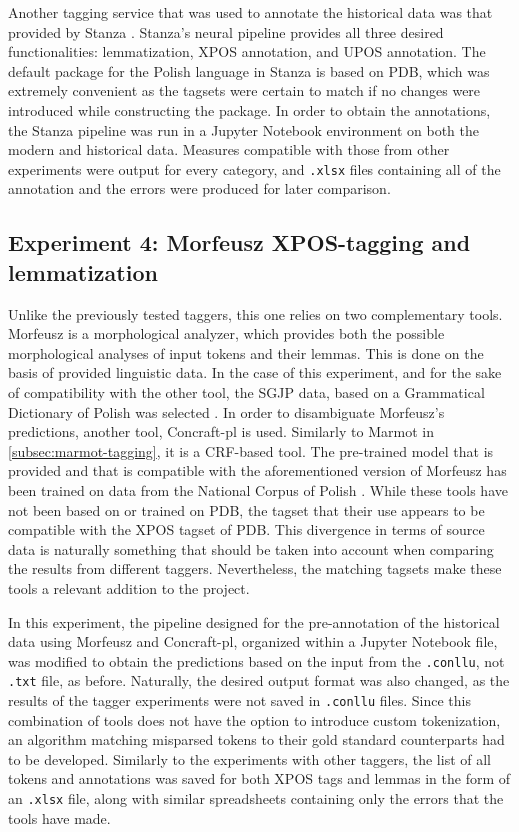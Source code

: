 Another tagging service that was used to annotate the historical data was that provided by Stanza \citep{manning-etal-2014-stanford, qi2020stanza}. Stanza's neural pipeline provides all three desired functionalities: lemmatization, XPOS annotation, and UPOS annotation. The default package for the Polish language in Stanza is based on PDB, which was extremely convenient as the tagsets were certain to match if no changes were introduced while constructing the package. In order to obtain the annotations, the Stanza pipeline was run in a Jupyter Notebook environment on both the modern and historical data. Measures compatible with those from other experiments were output for every category, and \texttt{.xlsx} files containing all of the annotation and the errors were produced for later comparison.

\subsection{Experiment 4: Morfeusz XPOS-tagging and lemmatization}
\label{subsec:morfeusz-tagging}

Unlike the previously tested taggers, this one relies on two complementary tools. Morfeusz is a morphological analyzer, which provides both the possible morphological analyses of input tokens and their lemmas. This is done on the basis of provided linguistic data. In the case of this experiment, and for the sake of compatibility with the other tool, the SGJP data, based on a Grammatical Dictionary of Polish was selected \citep{sal:etal:15, kie:wol:17:morf}. In order to disambiguate Morfeusz's predictions, another tool, Concraft-pl is used. Similarly to Marmot in \autoref{subsec:marmot-tagging}, it is a CRF-based tool. The pre-trained model that is provided and that is compatible with the aforementioned version of Morfeusz has been trained on data from the National Corpus of Polish \citep{nkjp, waszczuk-2012-harnessing, waszczuk2018morphosyntactic}. While these tools have not been based on or trained on PDB, the tagset that their use appears to be compatible with the XPOS tagset of PDB. This divergence in terms of source data is naturally something that should be taken into account when comparing the results from different taggers. Nevertheless, the matching tagsets make these tools a relevant addition to the project.

In this experiment, the pipeline designed for the pre-annotation of the historical data using Morfeusz and Concraft-pl, organized within a Jupyter Notebook file, was modified to obtain the predictions based on the input from the \texttt{.conllu}, not \texttt{.txt} file, as before. Naturally, the desired output format was also changed, as the results of the tagger experiments were not saved in \texttt{.conllu} files. Since this combination of tools does not have the option to introduce custom tokenization, an algorithm matching misparsed tokens to their gold standard counterparts had to be developed. Similarly to the experiments with other taggers, the list of all tokens and annotations was saved for both XPOS tags and lemmas in the form of an \texttt{.xlsx} file, along with similar spreadsheets containing only the errors that the tools have made.

